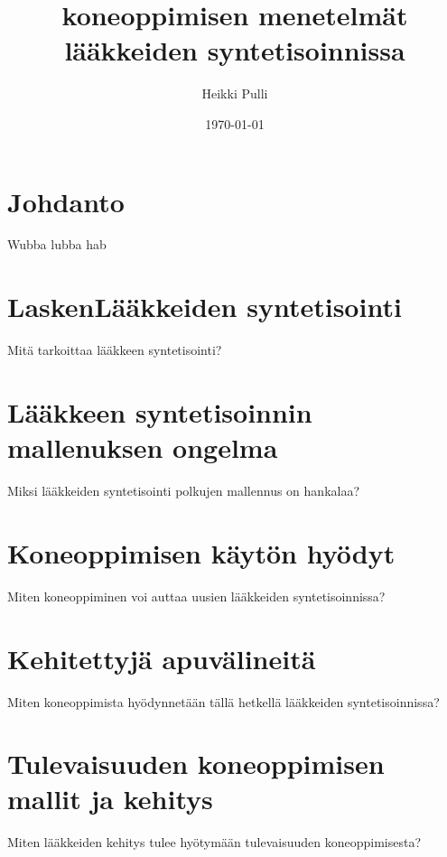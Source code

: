 \documentclass[finnish,twoside,censored,subject,sw-line]{HYthesisML}
\title{koneoppimisen menetelmät lääkkeiden syntetisoinnissa}
\author{Heikki Pulli}
\date{\today}
\begin{document}
\maketitle

\newpage
\mytableofcontents
\mainmatter

\chapter{Johdanto}

Wubba lubba hab~\cite{SeglerMarwinHS2018Pcsw}

\chapter{LaskenLääkkeiden syntetisointi}

Mitä tarkoittaa lääkkeen syntetisointi?

\chapter{Lääkkeen syntetisoinnin mallenuksen ongelma}

Miksi lääkkeiden syntetisointi polkujen mallennus on hankalaa?~\cite{ButlerKeithT2018Mlfm}

\chapter{Koneoppimisen käytön hyödyt}

Miten koneoppiminen voi auttaa uusien lääkkeiden syntetisoinnissa?~\cite{VamathevanJessica2019Aoml}

\chapter{Kehitettyjä apuvälineitä}

Miten koneoppimista hyödynnetään tällä hetkellä lääkkeiden syntetisoinnissa? ~\cite{SeglerMarwinHS2018Pcsw,10.1145/3219819.3219882,10.1145/3450439.3451879}

\chapter{Tulevaisuuden koneoppimisen mallit ja kehitys}

Miten lääkkeiden kehitys tulee hyötymään tulevaisuuden koneoppimisesta?~\cite{ButlerKeithT2018Mlfm}

\cleardoublepage                          %
{}  %
\printbibliography

\backmatter
\end{document}

